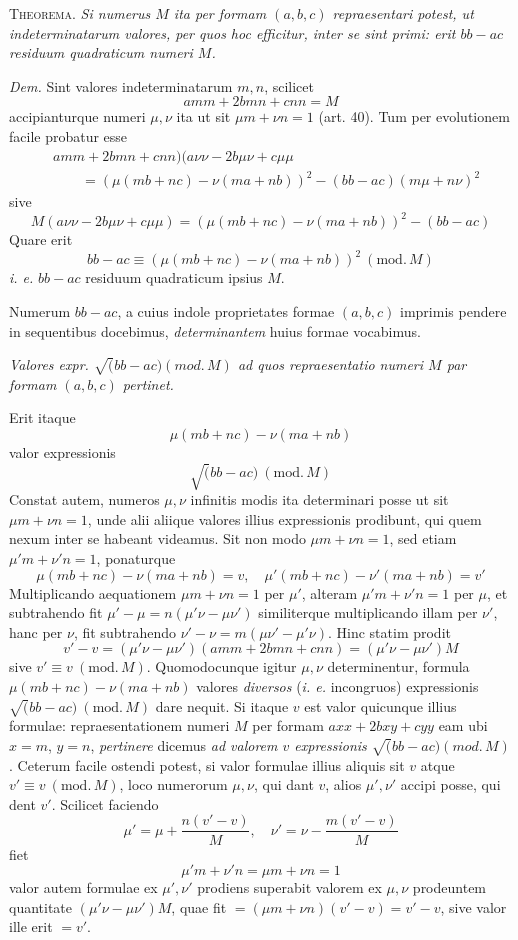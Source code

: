\textsc{Theorema.} \textit{Si numerus $M$ ita per formam $(a,b,c)$ repraesentari potest, ut indeterminatarum valores, per quos hoc efficitur, inter se sint primi: erit $bb-ac$ residuum quadraticum numeri $M$.}

\textit{Dem.} Sint valores indeterminatarum $m,n$, scilicet
\[
amm+2bmn+cnn=M
\]
accipianturque numeri $\mu,\nu$ ita ut sit $\mu m+\nu n=1$ (art. 40). Tum per evolutionem facile probatur esse
\[
\begin{aligned}
&amm+2bmn+cnn)(a\nu\nu-2b\mu\nu+c\mu\mu\\
&\qquad={}(\mu(mb+nc)-\nu(ma+nb))^2-(bb-ac)(m\mu+n\nu)^2
\end{aligned}
\]
sive
\[
M(a\nu\nu-2b\mu\nu+c\mu\mu)=(\mu(mb+nc)-\nu(ma+nb))^2-(bb-ac)
\]
Quare erit
\[
bb-ac\equiv(\mu(mb+nc)-\nu(ma+nb))^2\ (\mathrm{mod.}\,M)
\]
\textit{i. e.} $bb-ac$ residuum quadraticum ipsius $M$.

Numerum $bb-ac$, a cuius indole proprietates formae $(a,b,c)$ imprimis pendere in sequentibus docebimus, \textit{determinantem} huius formae vocabimus.

\begin{center}
\textit{Valores expr. $\surd(bb-ac)(\mathit{mod.}\,M)$ ad quos repraesentatio numeri $M$ par formam $(a,b,c)$ pertinet.}
\end{center}

Erit itaque
\[
\mu(mb+nc)-\nu(ma+nb)
\]
valor expressionis
\[
\surd(bb-ac)\ (\mathrm{mod.}\,M)
\]
Constat autem, numeros $\mu,\nu$ infinitis modis ita determinari posse ut sit $\mu m+\nu n=1$, unde alii aliique valores illius expressionis prodibunt, qui quem nexum inter se habeant videamus. Sit non modo $\mu m+\nu n=1$, sed etiam $\mu'm+\nu'n=1$, ponaturque
\[
\mu(mb+nc)-\nu(ma+nb)=v,\quad
\mu'(mb+nc)-\nu'(ma+nb)=v'
\]
Multiplicando aequationem $\mu m+\nu n=1$ per $\mu'$, alteram $\mu'm+\nu'n=1$ per $\mu$, et subtrahendo fit $\mu'-\mu=n(\mu'\nu-\mu\nu')$ similiterque multiplicando illam per $\nu'$, hanc per $\nu$, fit subtrahendo $\nu'-\nu=m(\mu\nu'-\mu'\nu)$. Hinc statim prodit
\[
v'-v=(\mu'\nu-\mu\nu')(amm+2bmn+cnn)=(\mu'\nu-\mu\nu')M
\]
sive $v'\equiv v\ (\mathrm{mod.}\,M)$. Quomodocunque igitur $\mu,\nu$ determinentur, formula $\mu(mb+nc)-\nu(ma+nb)$ valores \textit{diversos} (\textit{i. e.} incongruos) expressionis $\surd(bb-ac)\ (\mathrm{mod.}\,M)$ dare nequit. Si itaque $v$ est valor quicunque illius formulae: repraesentationem numeri $M$ per formam $axx+2bxy+cyy$ eam ubi $x=m$, $y=n$, \textit{pertinere} dicemus \textit{ad valorem $v$ expressionis $\surd(bb-ac)(\mathit{mod.}\,M)$}. Ceterum facile ostendi potest, si valor formulae illius aliquis sit $v$ atque $v'\equiv v\ (\mathrm{mod.}\,M)$, loco numerorum $\mu,\nu$, qui dant $v$, alios $\mu',\nu'$ accipi posse, qui dent $v'$. Scilicet faciendo
\[
\mu'=\mu+\frac{n(v'-v)}{M},\quad
\nu'=\nu-\frac{m(v'-v)}{M}
\]
fiet
\[
\mu'm+\nu'n=\mu m+\nu n=1
\]
valor autem formulae ex $\mu',\nu'$ prodiens superabit valorem ex $\mu,\nu$ prodeuntem quantitate $(\mu'\nu-\mu\nu')M$, quae fit $=(\mu m+\nu n)(v'-v)=v'-v$, sive valor ille erit $=v'$.

